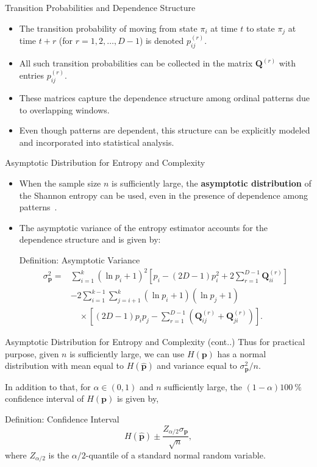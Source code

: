 \documentclass{beamer}
\begin{document}
\begin{frame}{Transition Probabilities and Dependence Structure}
	\begin{itemize}
		\item The transition probability of moving from state $\pi_i$ at time $t$ to state $\pi_j$ at time $t+r$ (for $r = 1, 2, \ldots, D-1$) is denoted $p^{(r)}_{ij}$.
		\item All such transition probabilities can be collected in the matrix $\mathbf{Q}^{(r)}$ with entries $p^{(r)}_{ij}$.
		\item These matrices capture the dependence structure among ordinal patterns due to overlapping windows.
		\item Even though patterns are dependent, this structure can be explicitly modeled and incorporated into statistical analysis.
	\end{itemize}
\end{frame}

\begin{frame}{Asymptotic Distribution for Entropy and Complexity}
	\begin{itemize}
		\item When the sample size $n$ is sufficiently large, the \textbf{asymptotic distribution} of the Shannon entropy can be used, even in the presence of dependence among patterns~\cite{Rey2023a}.
		\item The asymptotic variance of the entropy estimator accounts for the dependence structure and is given by:
	\begin{block}{Definition: Asymptotic Variance}
		\[
			\begin{split}
				\sigma^2_{\mathbf{p}} = & \sum_{i=1}^{k}(\ln p_i + 1)^2 
				\left[ p_i - (2D - 1)p_i^2 + 2\sum_{r=1}^{D-1} \mathbf{Q}^{(r)}_{ii} \right] \\
				& - 2 \sum_{i=1}^{k-1} \sum_{j=i+1}^{k} (\ln p_i + 1)(\ln p_j + 1) \\
				& \quad \times \left[ (2D - 1)p_i p_j - \sum_{r=1}^{D-1} \left( \mathbf{Q}^{(r)}_{ij} + \mathbf{Q}^{(r)}_{ji} \right) \right].
			\end{split}
			\]
	\end{block}
	\end{itemize}
\end{frame}

\begin{frame}{Asymptotic Distribution for Entropy and Complexity (cont..)}
	Thus for practical purpose, given $n$ is sufficiently large, we can use $H(\mathbf{p})$ has a normal distribution with mean equal to $H(\widehat{\mathbf{p}})$ and variance equal to $\sigma^2_{\mathbf{p}}/n$.
	
	In addition to that, for $\alpha\in(0,1)$ and $n$ sufficiently large, the $(1-\alpha)\SI{100}{\percent}$ confidence interval of $H(\mathbf{p})$ is given by, 
	\begin{block}{Definition: Confidence Interval}
		\[
		H(\widehat{\mathbf{p}})\pm \dfrac{Z_{\alpha/2}\sigma_{\mathbf{p}}}{\sqrt{n}},
		\label{eq:ConfidenceInterval}
		\]
		where $Z_{\alpha/2}$ is the $\alpha/2$-quantile of a standard normal random variable.
	\end{block} 
\end{frame}
\end{document}
